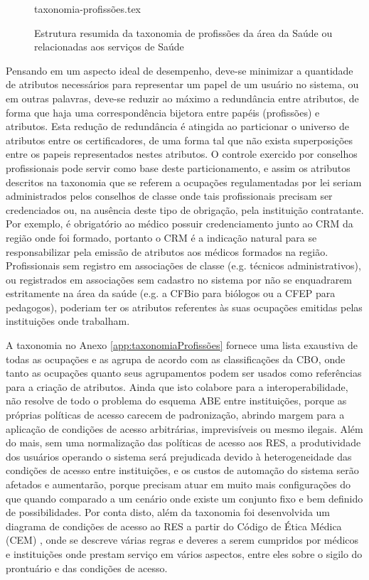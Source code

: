 \documentclass[a4paper,11pt]{article}
\begin{document}
\begin{figure}[h]
  \centering
  {taxonomia-profissões.tex}
  \caption{Estrutura resumida da taxonomia de profissões da área da Saúde ou relacionadas aos serviços de Saúde}
  \label{fig:taxonomiaPermissoes}
\end{figure}

Pensando em um aspecto ideal de desempenho, deve-se minimizar a quantidade de atributos necessários para representar um papel de um usuário no sistema, ou em outras palavras, deve-se reduzir ao máximo a redundância entre atributos, de forma que haja uma correspondência bijetora entre papéis (profissões) e atributos.
Esta redução de redundância é atingida ao particionar o universo de atributos entre os certificadores, de uma forma tal que não exista superposições entre os papeis representados nestes atributos.
O controle exercido por conselhos profissionais pode servir como base deste particionamento, e assim os atributos descritos na taxonomia que se referem a ocupações regulamentadas por lei seriam administrados pelos conselhos de classe onde tais profissionais precisam ser credenciados ou, na ausência deste tipo de obrigação, pela instituição contratante.
Por exemplo, é obrigatório ao médico possuir credenciamento junto ao CRM da região onde foi formado, portanto o CRM é a indicação natural para se responsabilizar pela emissão de atributos aos médicos formados na região.
Profissionais sem registro em associações de classe (e.g. técnicos administrativos), ou registrados em associações sem cadastro no sistema por não se enquadrarem estritamente na área da saúde (e.g. a CFBio para biólogos ou a CFEP para pedagogos), poderiam ter os atributos referentes às suas ocupações emitidas pelas instituições onde trabalham.

A taxonomia no Anexo \ref{app:taxonomiaProfissões} fornece uma lista exaustiva de todas as ocupações e as agrupa de acordo com as classificações da CBO, onde tanto as ocupações quanto seus agrupamentos podem ser usados como referências para a criação de atributos.
Ainda que isto colabore para a interoperabilidade, não resolve de todo o problema do esquema ABE entre instituições, porque as próprias políticas de acesso carecem de padronização, abrindo margem para a aplicação de condições de acesso arbitrárias, imprevisíveis ou mesmo ilegais.
Além do mais, sem uma normalização das políticas de acesso aos RES, a produtividade dos usuários operando o sistema será prejudicada devido à heterogeneidade das condições de acesso entre instituições, e os custos de automação do sistema serão afetados e aumentarão, porque precisam atuar em muito mais configurações do que quando comparado a um cenário onde existe um conjunto fixo e bem definido de possibilidades.
Por conta disto, além da taxonomia foi desenvolvida um diagrama de condições de acesso ao RES a partir do Código de Ética Médica (CEM) \cite{ConselhoFederaldeMedicina2019}, onde se descreve várias regras e deveres a serem cumpridos por médicos e instituições onde prestam serviço em vários aspectos, entre eles sobre o sigilo do prontuário e das condições de acesso.
\end{document}
